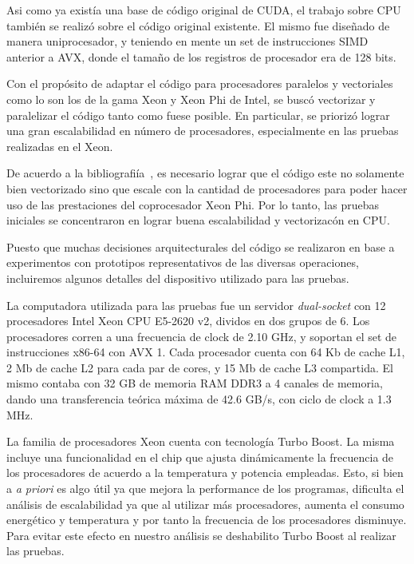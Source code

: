 Asi como ya exist\'ia una base de c\'odigo original de CUDA, el
trabajo sobre CPU tambi\'en se realiz\'o sobre el c\'odigo original
existente. El mismo fue dise\~nado de manera uniprocesador, y teniendo
en mente un set de instrucciones SIMD anterior a AVX, donde el tama\~no
de los registros de procesador era de 128 bits.

Con el prop\'osito de adaptar el c\'odigo para procesadores
paralelos y vectoriales como lo son los de la gama Xeon y Xeon Phi de
Intel, se busc\'o vectorizar y paralelizar el c\'odigo tanto como fuese
posible. En particular, se prioriz\'o lograr una gran escalabilidad en
n\'umero de procesadores, especialmente en las pruebas realizadas en el
Xeon.

De acuerdo a la bibliografi\'ia~\cite{Jeffers}, es necesario lograr que
el c\'odigo este no solamente bien vectorizado sino que escale con la
cantidad de procesadores para poder hacer uso de las prestaciones del
coprocesador Xeon Phi. Por lo tanto, las pruebas iniciales se concentraron
en lograr buena escalabilidad y vectorizac\'on en CPU.

Puesto que muchas decisiones arquitecturales del c\'odigo se realizaron en
base a experimentos con prototipos representativos de las diversas operaciones,
incluiremos algunos detalles del dispositivo utilizado para las pruebas.

La computadora utilizada para las pruebas fue un servidor \textit{dual-socket}
con 12 procesadores Intel Xeon CPU E5-2620 v2, dividos en dos grupos de 6. Los
procesadores corren a una frecuencia de clock de 2.10 GHz, y soportan el set
de instrucciones x86-64 con AVX 1.
Cada procesador cuenta con 64 Kb de cache L1, 2 Mb de cache L2 para cada par de cores, y
15 Mb de cache L3 compartida.
El mismo contaba con 32 GB de memoria RAM DDR3 a 4 canales de memoria, dando 
una transferencia te\'orica m\'axima de 42.6 GB/s, con ciclo de clock a 1.3 MHz.

La familia de procesadores Xeon cuenta con tecnolog\'ia Turbo Boost. La misma 
incluye una funcionalidad en el chip que ajusta din\'amicamente la frecuencia
de los procesadores de acuerdo a la temperatura y potencia empleadas. Esto, si
bien a \textit{a priori} es algo \'util ya que mejora la performance de los 
programas, dificulta el an\'alisis de escalabilidad ya que al utilizar m\'as
procesadores, aumenta el consumo energ\'etico y temperatura y por tanto la
frecuencia de los procesadores disminuye. Para evitar este efecto en nuestro
an\'alisis se deshabilito Turbo Boost al realizar las pruebas.

